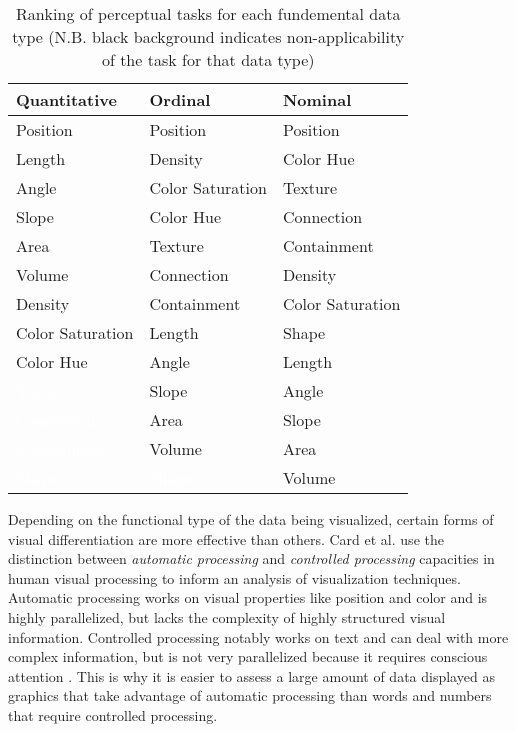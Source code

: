\begin{table}
    \begin{center}
    \begin{tabular}{ | l | l | l | }
    \hline
    Quantitative & Ordinal & Nominal \\ \hline
    Position & Position & Position \\
    Length & Density & Color Hue \\
    Angle & Color Saturation & Texture \\
    Slope & Color Hue & Connection \\
    Area & Texture & Containment \\
    Volume & Connection & Density \\
    Density & Containment & Color Saturation \\
    Color Saturation & Length & Shape \\
    Color Hue & Angle & Length \\
    \cellcolor{black}\textcolor{white}{Texture} & Slope & Angle \\
    \cellcolor{black}\textcolor{white}{Connection} & Area & Slope \\
    \cellcolor{black}\textcolor{white}{Containment} & Volume & Area \\
    \cellcolor{black}\textcolor{white}{Shape} & \cellcolor{black}\textcolor{white}{Shape} & Volume \\
    \hline
    \end{tabular}
    \end{center}
    \caption{Ranking of perceptual tasks for each fundemental data type (N.B. black background indicates non-applicability of the task for that data type) \cite{jock1986}}
    \label{tab:perceptual}
\end{table}

Depending on the functional type of the data being visualized, certain forms of visual differentiation are more effective than others. Card et al. \cite{card1997} use the distinction between \emph{automatic processing} and \emph{controlled processing} capacities in human visual processing to inform an analysis of visualization techniques. Automatic processing works on visual properties like position and color and is highly parallelized, but lacks the complexity of highly structured visual information. Controlled processing notably works on text and can deal with more complex information, but is not very parallelized because it requires conscious attention \cite{controlauto1977}. This is why it is easier to assess a large amount of data displayed as graphics that take advantage of automatic processing than words and numbers that require controlled processing.

